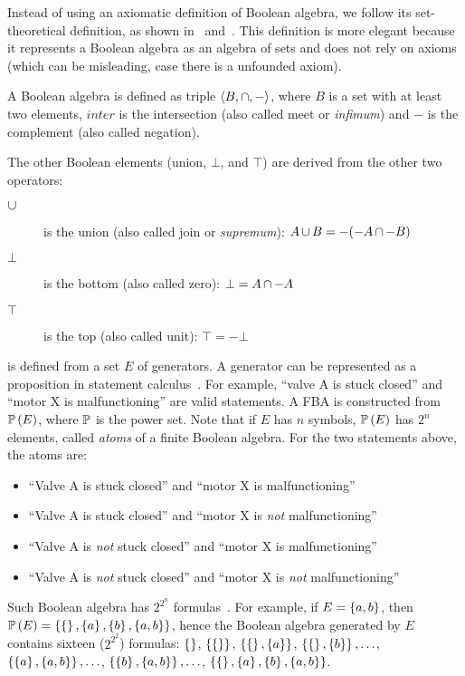 \documentclass[en,twoside,onehalfspacing,phd]{risethesis}
\newcommand{\setsin}[1]{\ensuremath\left\{ #1 \right\}}
\newcommand{\anglesin}[1]{\ensuremath\left\langle #1 \right\rangle}
\def\union{\ensuremath\operatorname{\cup}}
\def\inter{\ensuremath\operatorname{\cap}}
\def\powersetop{\ensuremath\mathbb{P}}
\newcommand{\powerset}[1]{\ensuremath\powersetop\left(#1\right)}
\begin{document}
Instead of using an axiomatic definition of Boolean algebra, we follow its set-theoretical definition, as shown in~\cite[pp. 254--258]{Stoll1979} and~\cite[pp. 8--11]{GH2009}.
This definition is more elegant because it represents a Boolean algebra as an algebra of sets and does not rely on axioms (which can be misleading, case there is a unfounded axiom).

\begin{Def}
\label{def:boolean-algebra}
A Boolean algebra is defined as triple $\anglesin{B, \inter, -}$, where $B$ is a set with at least two elements, $inter$ is the intersection (also called meet or \emph{infimum}) and $-$ is the complement (also called negation).
\end{Def}
%
\noindent The other Boolean elements (union, $\bot$, and $\top$) are derived from the other two operators:
\begin{description}
  \item[$\union$] is the union (also called join or \emph{supremum}): $A \union B = -(-A \inter -B)$
  \item [$\bot$] is the bottom (also called zero): $\bot = A \inter -A$
  \item [$\top$] is the top (also called unit): $\top = -\bot$
\end{description}

\begin{sloppypar}
 is defined from a set $E$ of generators.
A generator can be represented as a proposition in statement calculus~\cite[p. 274]{Stoll1979}.
For example, ``valve A is stuck closed'' and ``motor X is malfunctioning'' are valid statements.
A \acl{FBA} is constructed from $\powerset{E}$, where $\powersetop$ is the power set.
Note that if $E$ has $n$ symbols, $\powerset{E}$ has $2^{n}$ elements, called \emph{atoms} of a finite Boolean algebra. 
For the two statements above, the atoms are:
\begin{itemize}
  \item ``Valve A is stuck closed'' and ``motor X is malfunctioning''
  \item ``Valve A is stuck closed'' and ``motor X is \emph{not} malfunctioning''
  \item ``Valve A is \emph{not} stuck closed'' and ``motor X is malfunctioning''
  \item ``Valve A is \emph{not} stuck closed'' and ``motor X is \emph{not} malfunctioning''
\end{itemize}
Such Boolean algebra has $2^{2^{n}}$ formulas~\cite[p. 261]{GH2009}.
For example, if $E = \setsin{a,b}$, then $\powerset{E} = \setsin{ \setsin{}, \setsin{a}, \setsin{b}, \setsin{a,b} }$, hence the Boolean algebra generated by $E$ contains sixteen ($2^{2^{2}}$) formulas: 
$\setsin{}$,
$\setsin{\setsin{}}$, 
$\setsin{\setsin{}, \setsin{a}}$, 
$\setsin{\setsin{}, \setsin{b}}, \ldots$, 
$\setsin{\setsin{a}, \setsin{a,b}}, \ldots$, 
$\setsin{\setsin{b}, \setsin{a,b}}, \ldots$, 
$\setsin{\setsin{}, \setsin{a}, \setsin{b}, \setsin{a,b}}$.
\end{sloppypar}
\end{document}
